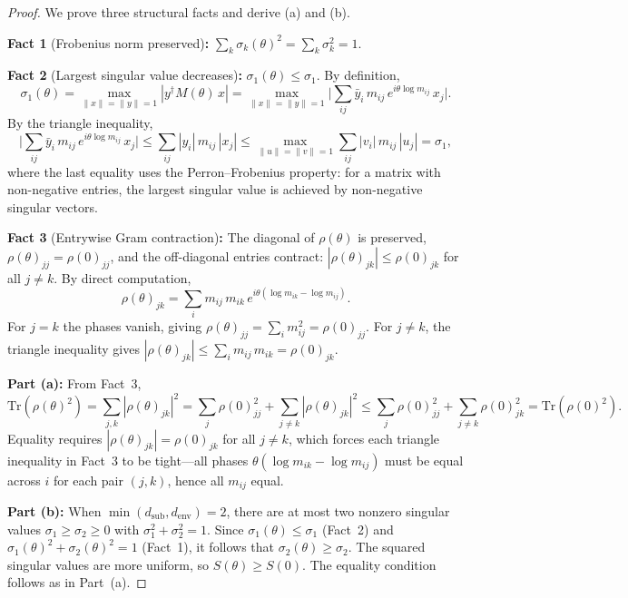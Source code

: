 \documentclass[12pt,a4paper]{article}
\theoremstyle{definition}
\theoremstyle{remark}
\begin{document}
\begin{proof}
We prove three structural facts and derive (a) and (b).

\textbf{Fact 1} (Frobenius norm preserved)\textbf{:} $\sum_k
\sigma_k(\theta)^2 = \sum_k \sigma_k^2 = 1$.

\textbf{Fact 2} (Largest singular value decreases)\textbf{:}
$\sigma_1(\theta) \leq \sigma_1$. By definition,
\[
  \sigma_1(\theta) = \max_{\|x\| = \|y\| = 1} |y^\dagger M(\theta)\, x|
  = \max_{\|x\| = \|y\| = 1} \Big|\sum_{ij} \bar{y}_i\, m_{ij}\,
  e^{i\theta \log m_{ij}}\, x_j \Big|.
\]
By the triangle inequality,
\[
  \Big|\sum_{ij} \bar{y}_i\, m_{ij}\, e^{i\theta \log m_{ij}}\, x_j
  \Big| \leq \sum_{ij} |y_i|\, m_{ij}\, |x_j|
  \leq \max_{\|u\| = \|v\| = 1} \sum_{ij} |v_i|\, m_{ij}\, |u_j|
  = \sigma_1,
\]
where the last equality uses the Perron--Frobenius property: for a
matrix with non-negative entries, the largest singular value is achieved
by non-negative singular vectors.

\textbf{Fact 3} (Entrywise Gram contraction)\textbf{:} The diagonal of
$\rho(\theta)$ is preserved, $\rho(\theta)_{jj} = \rho(0)_{jj}$, and
the off-diagonal entries contract: $|\rho(\theta)_{jk}| \leq
\rho(0)_{jk}$ for all $j \neq k$. By direct computation,
\[
  \rho(\theta)_{jk} = \sum_i m_{ij}\, m_{ik}\,
  e^{i\theta(\log m_{ik} - \log m_{ij})}.
\]
For $j = k$ the phases vanish, giving $\rho(\theta)_{jj} = \sum_i
m_{ij}^2 = \rho(0)_{jj}$. For $j \neq k$, the triangle inequality
gives $|\rho(\theta)_{jk}| \leq \sum_i m_{ij}\, m_{ik} =
\rho(0)_{jk}$.

\textbf{Part (a):} From Fact~3,
\[
  \mathrm{Tr}(\rho(\theta)^2) = \sum_{j,k} |\rho(\theta)_{jk}|^2
  = \sum_j \rho(0)_{jj}^2 + \sum_{j \neq k} |\rho(\theta)_{jk}|^2
  \leq \sum_j \rho(0)_{jj}^2 + \sum_{j \neq k} \rho(0)_{jk}^2
  = \mathrm{Tr}(\rho(0)^2).
\]
Equality requires $|\rho(\theta)_{jk}| = \rho(0)_{jk}$ for all
$j \neq k$, which forces each triangle inequality in Fact~3 to be
tight---all phases $\theta(\log m_{ik} - \log m_{ij})$ must be equal
across $i$ for each pair $(j,k)$, hence all $m_{ij}$ equal.

\textbf{Part (b):} When $\min(d_{\mathrm{sub}}, d_{\mathrm{env}}) =
2$, there are at most two nonzero singular values $\sigma_1 \geq
\sigma_2 \geq 0$ with $\sigma_1^2 + \sigma_2^2 = 1$. Since
$\sigma_1(\theta) \leq \sigma_1$ (Fact~2) and $\sigma_1(\theta)^2 +
\sigma_2(\theta)^2 = 1$ (Fact~1), it follows that $\sigma_2(\theta)
\geq \sigma_2$. The squared singular values are more uniform, so
$S(\theta) \geq S(0)$. The equality condition follows as in Part~(a).
\end{proof}
\end{document}
